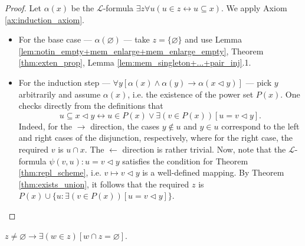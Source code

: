 \begin{proof}
    \leanok
    Let $\alpha (x)$ be the $\mathcal{L}$-formula 
    $\exists z \forall u (u\in z \leftrightarrow u \subseteq x)$.
    We apply Axiom \ref{ax:induction_axiom}.
    \begin{itemize}
        \item For the base case — $\alpha (\varnothing)$ — take $z=\{\varnothing\}$ and use 
        Lemma \ref{lem:notin_empty+mem_enlarge+mem_enlarge_empty}, 
        Theorem \ref{thm:exten_prop}, Lemma \ref{lem:mem_singleton+...+pair_inj}.1.
        \item For the induction step 
        — $\forall y[\alpha(x) \land \alpha(y) \rightarrow \alpha(x \lhd y)]$ — 
        pick $y$ arbitrarily and assume $\alpha(x)$, i.e. the existence of the power set $P(x)$.
        One checks directly from the definitions that 
        $$u \subseteq x \lhd y \leftrightarrow u \in P(x) \lor \exists (v \in P(x))[u=v\lhd y].$$
        Indeed, for the $\rightarrow$ direction, the cases $y \notin u$ and $y \in u$ correspond to 
        the left and right cases of the disjunction, respectively, where for the right case, 
        the required $v$ is $u \cap x$. The $\leftarrow$ direction is rather trivial.
        Now, note that the $\mathcal{L}$-formula $\psi(v,u): u = v \lhd y$ satisfies the condition 
        for Theorem \ref{thm:repl_scheme}, i.e. $v \mapsto v \lhd y$ is a well-defined mapping.
        By Theorem \ref{thm:exists_union}, 
        it follows that the required $z$ is $P(x) \cup \{u : \exists (v \in P(x)) [u=v\lhd y]\}$.
    \end{itemize}
\end{proof}

\begin{theorem}
    \label{thm:found_prop}
    \leanok
    $z\neq \varnothing \rightarrow \exists (w \in z)[w\cap z = \varnothing]$.
\end{theorem}

